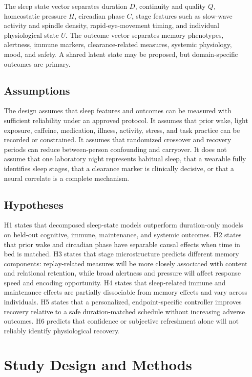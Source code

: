 \documentclass[conference]{IEEEtran}
\begin{document}
The sleep state vector separates duration $D$, continuity and quality $Q$, homeostatic pressure $H$, circadian phase $C$, stage features such as slow-wave activity and spindle density, rapid-eye-movement timing, and individual physiological state $U$. The outcome vector separates memory phenotypes, alertness, immune markers, clearance-related measures, systemic physiology, mood, and safety. A shared latent state may be proposed, but domain-specific outcomes are primary.

\subsection{Assumptions}
The design assumes that sleep features and outcomes can be measured with sufficient reliability under an approved protocol. It assumes that prior wake, light exposure, caffeine, medication, illness, activity, stress, and task practice can be recorded or constrained. It assumes that randomized crossover and recovery periods can reduce between-person confounding and carryover. It does not assume that one laboratory night represents habitual sleep, that a wearable fully identifies sleep stages, that a clearance marker is clinically decisive, or that a neural correlate is a complete mechanism.

\subsection{Hypotheses}
H1 states that decomposed sleep-state models outperform duration-only models on held-out cognitive, immune, maintenance, and systemic outcomes. H2 states that prior wake and circadian phase have separable causal effects when time in bed is matched. H3 states that stage microstructure predicts different memory components: replay-related measures will be more closely associated with content and relational retention, while broad alertness and pressure will affect response speed and encoding opportunity. H4 states that sleep-related immune and maintenance effects are partially dissociable from memory effects and vary across individuals. H5 states that a personalized, endpoint-specific controller improves recovery relative to a safe duration-matched schedule without increasing adverse outcomes. H6 predicts that confidence or subjective refreshment alone will not reliably identify physiological recovery.

\section{Study Design and Methods}
\end{document}
